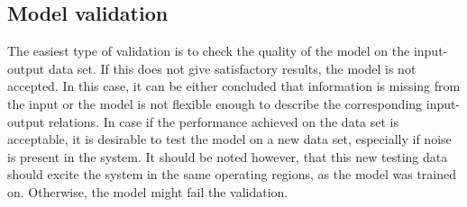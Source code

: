 \subsection{Model validation}
\label{model_validation}

The easiest type of validation is to check the quality of the model on the input-output data set. If this does not give satisfactory results, the model is not accepted. In this case, it can be either concluded that information is missing from the input or the model is not flexible enough to describe the corresponding input-output relations. In case if the performance achieved on the data set is acceptable, it is desirable to test the model on a new data set, especially if noise is present in the system. It should be noted however, that this new testing data should excite the system in the same operating regions, as the model was trained on. Otherwise, the model might fail the validation. 

